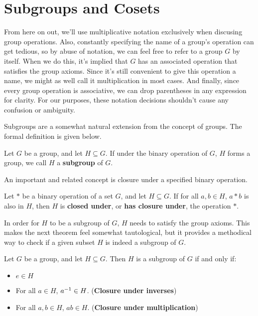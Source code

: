 \section{Subgroups and Cosets}

From here on out, we'll use multiplicative notation exclusively when discusing group operations. Also, constantly specifying the name of a group's operation can get tedious, so by abuse of notation, we can feel free to refer to a group $G$ by itself. When we do this, it's implied that $G$ has an associated operation that satisfies the group axioms. Since it's still convenient to give this operation a name, we might as well call it multiplication in most cases. And finally, since every group operation is associative, we can drop parentheses in any expression for clarity. For our purposes, these notation decisions shouldn't cause any confusion or ambiguity.

Subgroups are a somewhat natural extension from the concept of groups. The formal definition is given below.

\begin{definition}
Let $G$ be a group, and let $H \subseteq G$. If under the binary operation of $G$, $H$ forms a group, we call $H$ a \textbf{subgroup} of $G$.
\end{definition}

An important and related concept is closure under a specified binary operation.

\begin{definition}
Let $*$ be a binary operation of a set $G$, and let $H \subseteq G$. If for all $a, b \in H$, $a*b$ is also in $H$, then $H$ is \textbf{closed under}, or \textbf{has closure under}, the operation $*$.
\end{definition}

In order for $H$ to be a subgroup of $G$, $H$ needs to satisfy the group axioms. This makes the next theorem feel somewhat tautological, but it provides a methodical way to check if a given subset $H$ is indeed a subgroup of $G$.

\begin{theorem}
\label{subgroup}
Let $G$ be a group, and let $H \subseteq G$. Then $H$ is a subgroup of $G$ if and only if:
\begin{itemize}
    \item $e \in H$
    \item For all $a \in H$, $a^{-1} \in H$. (\textbf{Closure under inverses})
    \item For all $a, b \in H$, $ab \in H$. (\textbf{Closure under multiplication})
\end{itemize}
\end{theorem}

